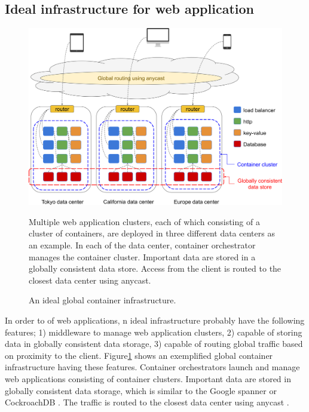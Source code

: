 \subsection{Ideal infrastructure for  web application}

\begin{figure}[h]
\begin{center}
\includegraphics[width=0.9\columnwidth]{Figs/global_container_infrastructure}
\end{center}
\caption{
An ideal global container infrastructure.
}
\centering\parbox[c]{0.9\columnwidth}{
Multiple web application clusters, each of which consisting of a cluster of containers, are deployed in three different data centers as an example.
In each of the data center, container orchestrator manages the container cluster.
Important data are stored in a globally consistent data store.
Access from the client is routed to the closest data center using anycast.
}
\label{fig:global_container_infrastructure}
\end{figure}


In order to  of web applications, 
n ideal infrastructure probably have the following features;
1)  middleware to manage web application clusters,
2) capable of storing data in globally consistent data storage,
3) capable of routing global traffic based on proximity to the client.
%
Figure\ref{fig:global_container_infrastructure} shows an exemplified global container infrastructure having these features.
Container orchestrators launch and manage web applications consisting of container clusters.
Important data are stored in globally consistent data storage, which is similar to the Google spanner \cite{Corbett:2013:SGG:2518037.2491245,Cooper:2013:SGG:2485732.2485756} or CockroachDB \cite{pavlo2016s}.
The traffic is routed to the closest data center using anycast \cite{rfc1546,weiden2010anycast}.


